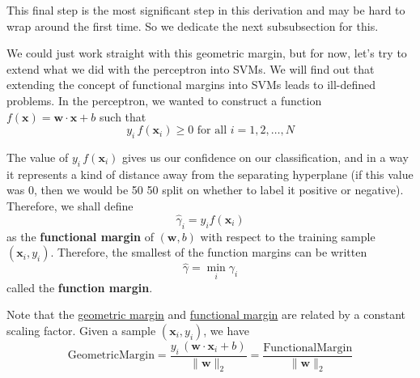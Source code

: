   This final step is the most significant step in this derivation and may be hard to wrap around the first time. So we dedicate the next subsubsection for this. 

  
  We could just work straight with this geometric margin, but for now, let's try to extend what we did with the perceptron into SVMs. We will find out that extending the concept of functional margins into SVMs leads to ill-defined problems. In the perceptron, we wanted to construct a function $f(\mathbf{x}) = \mathbf{w} \cdot \mathbf{x} + b$ such that 
  \begin{equation*}
    y_i \, f(\mathbf{x}_i) \geq 0 \text{ for all } i = 1, 2, \ldots, N
  \end{equation*}

  \begin{definition}
    \label{def:functional-margin}
    The value of $y_i \, f(\mathbf{x}_i)$ gives us our confidence on our classification, and in a way it represents a kind of distance away from the separating hyperplane (if this value was $0$, then we would be 50 50 split on whether to label it positive or negative). Therefore, we shall define 
    \begin{equation*}
        \hat{\gamma}_i = y_i f(\mathbf{x}_i) 
    \end{equation*}
  as the \textbf{functional margin} of $(\mathbf{w}, b)$ with respect to the training sample $(\mathbf{x}_i, y_i)$. Therefore, the smallest of the function margins can be written 
  \begin{equation*}
      \hat{\gamma} = \min_i \gamma_i 
  \end{equation*}
  called the \textbf{function margin}. 
  \end{definition}

  Note that the \hyperref[def:geometric-margin]{geometric margin} and \hyperref[def:functional-margin]{functional margin} are related by a constant scaling factor. Given a sample $(\mathbf{x}_i, y_i)$, we have 
  \begin{equation*}
      \mathrm{Geometric Margin} = \frac{y_i \, (\mathbf{w} \cdot \mathbf{x}_i + b)}{\|\mathbf{w}\|_2} = \frac{\mathrm{Functional Margin}}{\|\mathbf{w}\|_2}
  \end{equation*}

